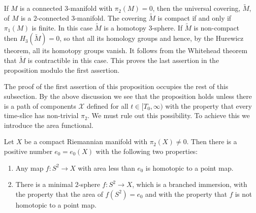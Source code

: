 If $M$ is a connected $3$-manifold with $\pi_2(M)=0$, then the
universal covering, $\widetilde M$, of $M$ is a $2$-connected
$3$-manifold. The covering $\widetilde M$ is compact if and only if
$\pi_1(M)$ is finite. In this case $\widetilde M$ is a homotopy
$3$-sphere. If $\widetilde M$ is non-compact then $H_3(\widetilde
M)=0$, so that all its homology groups and hence, by the Hurewicz
theorem, all its homotopy groups vanish. It follows from the
Whitehead theorem  that $\widetilde M$ is contractible in this case.
This proves the last assertion in the proposition modulo the first
assertion.

The proof of the first assertion of this proposition occupies the
rest of this subsection. By the above discussion we see that the
proposition holds unless there is a path of components ${\mathcal
X}$ defined for all $t\in [T_0,\infty)$ with the property that every
time-slice has non-trivial $\pi_2$. We must rule out this
possibility. To achieve this we introduce the area functional.

\begin{lemma}
\label{lem:minimal-sphere-energy-gap}
Let $X$ be a compact Riemannian manifold with $\pi_2(X)\not=0$. Then
there is a positive number $e_0=e_0(X)$ with the following two
properties:
\begin{enumerate} \item Any map $f\colon S^2\to X$ with area less
than $e_0$ is homotopic to a point map. \item There is a minimal
$2$-sphere $f\colon S^2\to X$, which is a branched immersion, with
the property that the area of $f(S^2)=e_0$ and with the property
that $f$ is not homotopic to a point map.
\end{enumerate}
\end{lemma}



